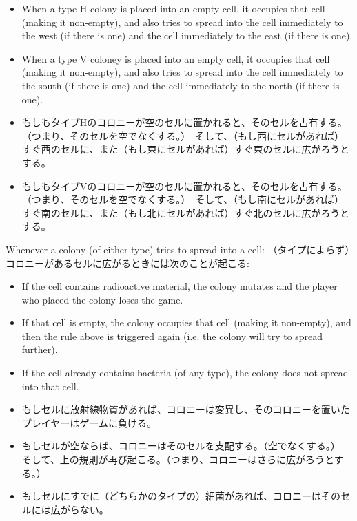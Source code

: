 \documentclass[uplatex,dvipdfmx]{jsarticle} \usepackage{amsmath,amssymb,bm}
\begin{document}
\begin{paracol}{2}
\begin{itemize}
\item When a type H colony is placed into an empty cell, it occupies that cell (making it non-empty), and also tries to spread into the cell immediately to the west (if there is one) and the cell immediately to the east (if there is one).
\item When a type V coloney is placed into an empty cell, it occupies that cell (making it non-empty), and also tries to spread into the cell immediately to the south (if there is one) and the cell immediately to the north (if there is one).
\end{itemize}
\switchcolumn
\begin{itemize}
\item もしもタイプHのコロニーが空のセルに置かれると、そのセルを占有する。（つまり、そのセルを空でなくする。）　そして、（もし西にセルがあれば）すぐ西のセルに、また（もし東にセルがあれば）すぐ東のセルに広がろうとする。
\item もしもタイプVのコロニーが空のセルに置かれると、そのセルを占有する。（つまり、そのセルを空でなくする。）　そして、（もし南にセルがあれば）すぐ南のセルに、また（もし北にセルがあれば）すぐ北のセルに広がろうとする。
\end{itemize}
\end{paracol}
\vspace{\baselineskip}
\begin{paracol}{2}
Whenever a colony (of either type) tries to spread into a cell:
\switchcolumn
（タイプによらず）コロニーがあるセルに広がるときには次のことが起こる:
\end{paracol}
\vspace{\baselineskip}
\begin{paracol}{2}
\begin{itemize}
\item If the cell contains radioactive material, the colony mutates and the player who placed the colony loses the game.
\item If that cell is empty, the colony occupies that cell (making it non-empty), and then the rule above is triggered again (i.e. the colony will try to spread further).
\item If the cell already contains bacteria (of any type), the colony does not spread into that cell.
\end{itemize}
\switchcolumn
\begin{itemize}
\item もしセルに放射線物質があれば、コロニーは変異し、そのコロニーを置いたプレイヤーはゲームに負ける。
\item もしセルが空ならば、コロニーはそのセルを支配する。（空でなくする。）　そして、上の規則が再び起こる。（つまり、コロニーはさらに広がろうとする。）
\item もしセルにすでに（どちらかのタイプの）細菌があれば、コロニーはそのセルには広がらない。
\end{itemize}
\end{paracol}
\end{document}
